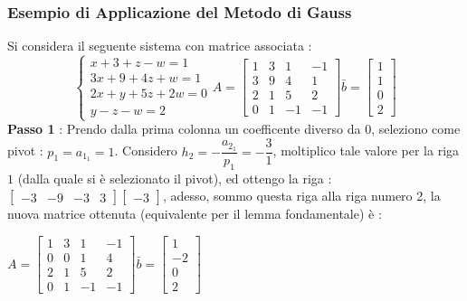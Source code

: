 \documentclass[12pt, letterpaper]{article}
\begin{document}
\subsubsection{Esempio di Applicazione del Metodo di Gauss}
Si considera il seguente sistema con matrice associata : \begin{equation}
    \begin{cases}
        x+3+z-w=1\\
        3x+9+4z+w=1\\
        2x+y+5z+2w=0\\
        y-z-w=2
    \end{cases} A=\begin{bmatrix}
        1&3&1&-1\\
        3&9&4&1\\
        2&1&5&2\\
        0&1&-1&-1
    \end{bmatrix}\bar b = \begin{bmatrix}
        1\\
        1\\
        0\\
        2
    \end{bmatrix}
\end{equation}
\textbf{Passo 1} : Prendo dalla prima colonna un coefficente diverso da 0, seleziono come 
pivot : \(p_1=a_{1_1}=1\). Considero \(h_2 = -\dfrac{a_{2_1}}{p_1}=-\dfrac{3}{1}\),  moltiplico tale valore per la 
riga \(1\) (dalla quale si è selezionato il pivot), ed ottengo la riga : \(\begin{bmatrix}
    -3&-9&-3&3
\end{bmatrix}\begin{bmatrix}
    -3
\end{bmatrix}\), adesso, sommo questa riga alla riga numero 2, la nuova matrice ottenuta (equivalente per 
il lemma fondamentale) è : \begin{center}\(
    A=\begin{bmatrix}
        1&3&1&-1\\
        0&0&1&4\\
        2&1&5&2\\
        0&1&-1&-1
    \end{bmatrix}\bar b = \begin{bmatrix}
        1\\
        -2\\
        0\\
        2
    \end{bmatrix}
\)\end{center}
\end{document}
